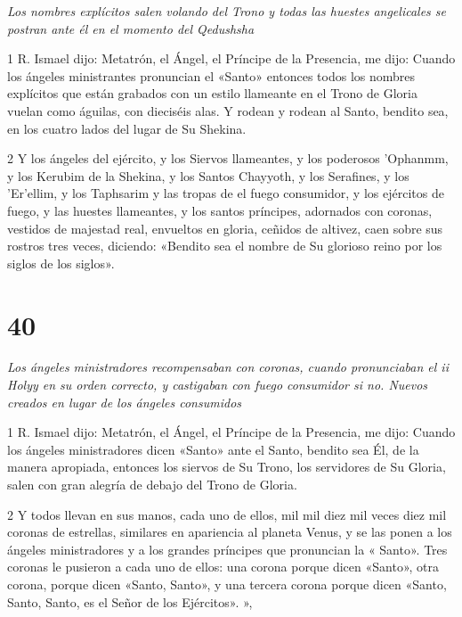 \par \textit{Los nombres explícitos salen volando del Trono y todas las huestes angelicales se postran ante él en el momento del Qedushsha}

\par 1 R. Ismael dijo: Metatrón, el Ángel, el Príncipe de la Presencia, me dijo: Cuando los ángeles ministrantes pronuncian el «Santo» entonces todos los nombres explícitos que están grabados con un estilo llameante en el Trono de Gloria vuelan como águilas, con dieciséis alas. Y rodean y rodean al Santo, bendito sea, en los cuatro lados del lugar de Su Shekina.

\par 2 Y los ángeles del ejército, y los Siervos llameantes, y los poderosos 'Ophanmm, y los Kerubim de la Shekina, y los Santos Chayyoth, y los Serafines, y los 'Er'ellim, y los Taphsarim y las tropas de el fuego consumidor, y los ejércitos de fuego, y las huestes llameantes, y los santos príncipes, adornados con coronas, vestidos de majestad real, envueltos en gloria, ceñidos de altivez, caen sobre sus rostros tres veces, diciendo: «Bendito sea el nombre de Su glorioso reino por los siglos de los siglos».


\chapter{40}

\par \textit{Los ángeles ministradores recompensaban con coronas, cuando pronunciaban el ii Holyy en su orden correcto, y castigaban con fuego consumidor si no. Nuevos creados en lugar de los ángeles consumidos}

\par 1 R. Ismael dijo: Metatrón, el Ángel, el Príncipe de la Presencia, me dijo: Cuando los ángeles ministradores dicen «Santo» ante el Santo, bendito sea Él, de la manera apropiada, entonces los siervos de Su Trono, los servidores de Su Gloria, salen con gran alegría de debajo del Trono de Gloria.

\par 2 Y todos llevan en sus manos, cada uno de ellos, mil mil diez mil veces diez mil coronas de estrellas, similares en apariencia al planeta Venus, y se las ponen a los ángeles ministradores y a los grandes príncipes que pronuncian la « Santo». Tres coronas le pusieron a cada uno de ellos: una corona porque dicen «Santo», otra corona, porque dicen «Santo, Santo», y una tercera corona porque dicen «Santo, Santo, Santo, es el Señor de los Ejércitos». »,

